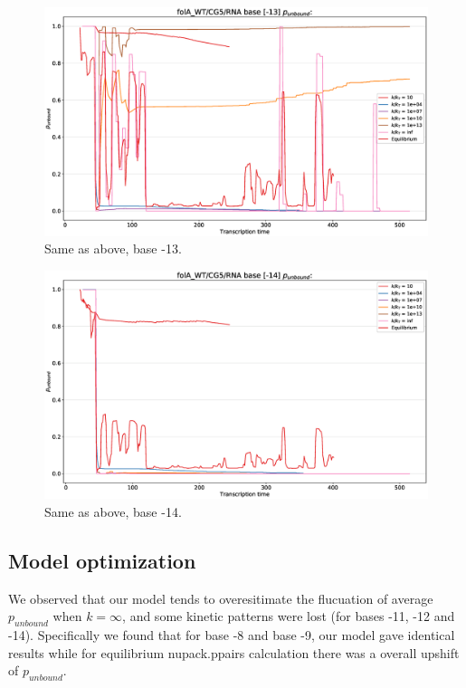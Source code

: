 \documentclass[11pt, a4paper]{article}
\begin{document}
\begin{figure}
\centering
\includegraphics[width=\linewidth]{p_unbound/RNA_p_unbound_base[-13]_k_tuning}
\caption{Same as above, base -13.}
\label{fig:RNA_p_unbound_base[-13]_k_tuning}
\end{figure}
\begin{figure}
\centering
\includegraphics[width=\linewidth]{p_unbound/RNA_p_unbound_base[-14]_k_tuning}
\caption{Same as above, base -14.}
\label{fig:RNA_p_unbound_base[-14]_k_tuning}
\end{figure}

\subsection{Model optimization}

We observed that our model tends to overesitimate the flucuation of average $p_{unbound}$ when $k=\infty$, and some kinetic patterns were lost (for bases -11, -12 and -14). Specifically we found that for base -8 and base -9, our model gave identical results while for equilibrium nupack.ppairs calculation there was a overall upshift of $p_{unbound}$.
\end{document}
